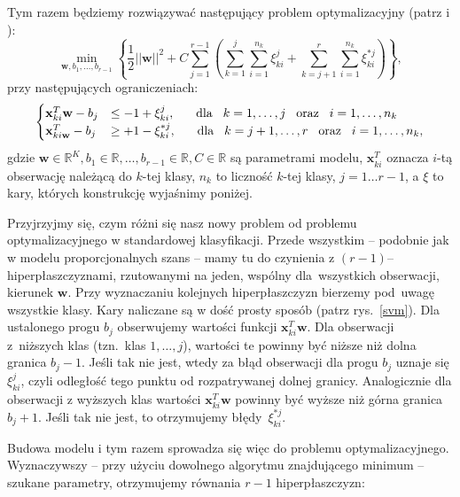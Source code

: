 \documentclass{mini}
\begin{document}
Tym razem będziemy rozwiązywać następujący problem optymalizacyjny (patrz \cite{pom} i \cite{svm}):
$$
\min_{\textbf{w}, b_1, \ldots, b_{r-1}}\left\lbrace \dfrac{1}{2}||\textbf{w}||^2+C\sum_{j=1}^{r-1}\left( \sum_{k=1}^{j}\sum_{i=1}^{n_k}\xi_{ki}^j+\sum_{k=j+1}^{r}\sum_{i=1}^{n_k}\xi_{ki}^{*j}\right)\right\rbrace,
$$
przy następujących ograniczeniach:
$$
\begin{cases}
\mathbf{x}^T_{ki}\textbf{w}-b_j&\leq -1 +\xi^j_{ki}, \hspace{6mm} \textrm{dla}\hspace{3mm} k=1,\ldots,j \hspace{3mm}\textrm{oraz}\hspace{3mm} i=1,\ldots,n_k \\
\mathbf{x}^T_{ki\textbf{w}}-b_j&\geq +1 -\xi^{*j}_{ki}, \hspace{6mm} \textrm{dla}\hspace{3mm} k=j+1,\ldots,r \hspace{3mm}\textrm{oraz}\hspace{3mm} i=1,\ldots,n_k, 
\end{cases}
$$
gdzie $\textbf{w}\in \mathbb{R}^K, b_1\in\mathbb{R}, \ldots, b_{r-1}\in\mathbb{R}, C\in\mathbb{R}$ są parametrami modelu, $\mathbf{x}^T_{ki}$ oznacza $i$-tą obserwację należącą do $k$-tej klasy, $n_k$ to liczność $k$-tej klasy, $j=1\ldots r-1$, a $\xi$ to kary, których konstrukcję wyjaśnimy poniżej.

Przyjrzyjmy się, czym różni się nasz nowy problem od problemu optymalizacyjnego w standardowej klasyfikacji. Przede wszystkim -- podobnie jak w modelu proporcjonalnych szans -- mamy tu do czynienia z $(r-1)$--hiperpłaszczyznami, rzutowanymi na jeden, wspólny dla~wszystkich obserwacji, kierunek $\mathbf{w}$. Przy wyznaczaniu kolejnych hiperpłaszczyzn bierzemy pod~uwagę wszystkie klasy. Kary naliczane są w dość prosty sposób (patrz rys.~\ref{svm}). Dla ustalonego progu $b_j$ obserwujemy wartości funkcji $\mathbf{x}_{ki}^T\textbf{w}$. Dla obserwacji z~niższych klas (tzn.~klas $1,\ldots, j$), wartości te powinny być niższe niż dolna granica $b_j-1$. Jeśli tak nie jest, wtedy za błąd obserwacji dla progu $b_j$ uznaje się $\xi^j_{ki}$, czyli odległość tego punktu od rozpatrywanej dolnej granicy. Analogicznie dla obserwacji z wyższych klas wartości $\mathbf{x}_{ki}^T\textbf{w}$ powinny być wyższe niż górna granica $b_j+1$. Jeśli tak nie jest, to otrzymujemy błędy~$\xi^{*j}_{ki}$.

Budowa modelu i tym razem sprowadza się więc do problemu optymalizacyjnego. Wyznaczywszy -- przy użyciu dowolnego algorytmu znajdującego minimum -- szukane parametry, otrzymujemy równania $r-1$ hiperpłaszczyzn:
\end{document}
